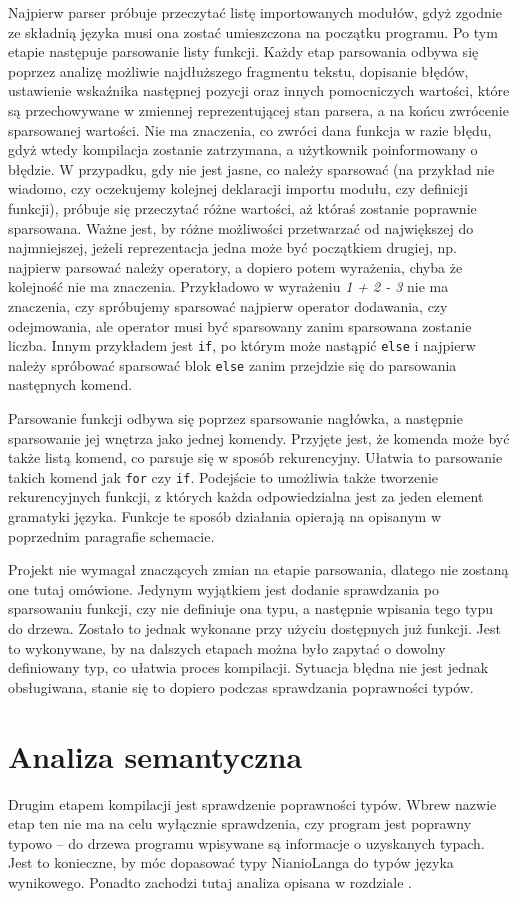 \documentclass[licencjacka]{pracamgr}
\begin{document}
Najpierw parser próbuje przeczytać listę importowanych modułów, gdyż zgodnie ze składnią języka musi ona zostać umieszczona na początku programu. Po
tym etapie następuje parsowanie listy funkcji. Każdy etap parsowania odbywa się poprzez analizę możliwie najdłuższego fragmentu tekstu, dopisanie błędów,
ustawienie wskaźnika następnej pozycji oraz innych pomocniczych wartości, które są przechowywane w zmiennej reprezentującej stan parsera, a na końcu
zwrócenie sparsowanej wartości. Nie ma znaczenia, co zwróci dana funkcja w razie błędu, gdyż wtedy kompilacja zostanie zatrzymana, a użytkownik
poinformowany o błędzie. W przypadku, gdy nie jest jasne, co należy sparsować (na przykład nie wiadomo, czy oczekujemy kolejnej deklaracji importu
modułu, czy definicji funkcji), próbuje się przeczytać różne wartości, aż któraś zostanie poprawnie sparsowana. Ważne jest, by różne możliwości
przetwarzać od największej do najmniejszej, jeżeli reprezentacja jedna może być początkiem drugiej, np. najpierw parsować należy operatory, a dopiero
potem wyrażenia, chyba że kolejność nie ma znaczenia. Przykładowo w wyrażeniu \emph{1 + 2 - 3} nie ma znaczenia, czy spróbujemy sparsować najpierw
operator dodawania, czy odejmowania, ale operator musi być sparsowany zanim sparsowana zostanie liczba. Innym przykładem jest \texttt{if}, po którym
może nastąpić \texttt{else} i najpierw należy spróbować sparsować blok \texttt{else} zanim przejdzie się do parsowania następnych komend.

Parsowanie funkcji odbywa się poprzez sparsowanie nagłówka, a następnie sparsowanie jej wnętrza jako jednej komendy. Przyjęte jest, że komenda może
być także listą komend, co parsuje się w sposób rekurencyjny. Ułatwia to parsowanie takich komend jak \texttt{for} czy \texttt{if}. Podejście to
umożliwia także tworzenie rekurencyjnych funkcji, z których każda odpowiedzialna jest za jeden element gramatyki języka. Funkcje te sposób działania
opierają na opisanym w poprzednim paragrafie schemacie.

Projekt nie wymagał znaczących zmian na etapie parsowania, dlatego nie zostaną one tutaj omówione. Jedynym wyjątkiem jest dodanie sprawdzania po
sparsowaniu funkcji, czy nie definiuje ona typu, a następnie wpisania tego typu do drzewa. Zostało to jednak wykonane przy użyciu dostępnych już
funkcji. Jest to wykonywane, by na dalszych etapach można było zapytać o dowolny definiowany typ, co ułatwia proces kompilacji. Sytuacja błędna nie
jest jednak obsługiwana, stanie się to dopiero podczas sprawdzania poprawności typów.
\section{Analiza semantyczna}
Drugim etapem kompilacji jest sprawdzenie poprawności typów. Wbrew nazwie etap ten nie ma na celu wyłącznie sprawdzenia, czy program jest poprawny
typowo -- do drzewa programu wpisywane są informacje o uzyskanych typach. Jest to konieczne, by móc dopasować typy NianioLanga do typów języka
wynikowego. Ponadto zachodzi tutaj analiza opisana w rozdziale \textit{}.
\end{document}
